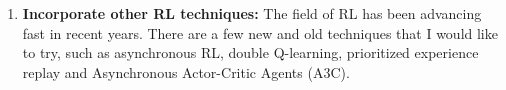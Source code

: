 \begin{enumerate}
    \item \textbf{Incorporate other RL techniques:} The field of RL has been advancing fast in recent years. There are a few new and old techniques that I would like to try, such as asynchronous RL, double Q-learning, prioritized experience replay and Asynchronous Actor-Critic Agents (A3C).

\end{enumerate}
